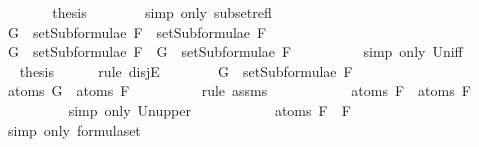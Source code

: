 \begin{isabellebody}
\ \ \ \ \isamarkupfalse%
\ \isamarkupfalse%
\ {\isacharquery}thesis\isanewline
\ \ \ \ \ \ \isamarkupfalse%
\ {\isacharparenleft}simp\ only{\isacharcolon}\ subset{\isacharunderscore}refl{\isacharparenright}\isanewline
\ \ \isamarkupfalse%
\isanewline
\ \ \ \ \isamarkupfalse%
\ {\isachardoublequoteopen}G\ {\isasymin}\ setSubformulae\ F{}\ {\isasymunion}\ setSubformulae\ F{}{\isachardoublequoteclose}\isanewline
\ \ \ \ \isamarkupfalse%
\ \isamarkupfalse%
\ {\isachardoublequoteopen}G\ {\isasymin}\ setSubformulae\ F{}\ {\isasymor}\ G\ {\isasymin}\ setSubformulae\ F{}{\isachardoublequoteclose}\ \ \isanewline
\ \ \ \ \ \ \isamarkupfalse%
\ {\isacharparenleft}simp\ only{\isacharcolon}\ Un{\isacharunderscore}iff{\isacharparenright}\isanewline
\ \ \ \ \isamarkupfalse%
\ \isamarkupfalse%
\ {\isacharquery}thesis\isanewline
\ \ \ \ \isamarkupfalse%
\ {\isacharparenleft}rule\ disjE{\isacharparenright}\isanewline
\ \ \ \ \ \ \isamarkupfalse%
\ {\isachardoublequoteopen}G\ {\isasymin}\ setSubformulae\ F{}{\isachardoublequoteclose}\isanewline
\ \ \ \ \ \ \isamarkupfalse%
\ \isamarkupfalse%
\ {\isachardoublequoteopen}atoms\ G\ {\isasymsubseteq}\ atoms\ F{}{\isachardoublequoteclose}\isanewline
\ \ \ \ \ \ \ \ \isamarkupfalse%
\ {\isacharparenleft}rule\ assms{\isacharparenleft}{}{\isacharparenright}{\isacharparenright}\isanewline
\ \ \ \ \ \ \isamarkupfalse%
\ \isamarkupfalse%
\ {\isachardoublequoteopen}{\isasymdots}\ {\isasymsubseteq}\ atoms\ F{}\ {\isasymunion}\ atoms\ F{}{\isachardoublequoteclose}\isanewline
\ \ \ \ \ \ \ \ \isamarkupfalse%
\ {\isacharparenleft}simp\ only{\isacharcolon}\ Un{\isacharunderscore}upper{}{\isacharparenright}\isanewline
\ \ \ \ \ \ \isamarkupfalse%
\ \isamarkupfalse%
\ {\isachardoublequoteopen}{\isasymdots}\ {\isacharequal}\ atoms\ {\isacharparenleft}F{}\ \isactrlbold {\isasymor}\ F{}{\isacharparenright}{\isachardoublequoteclose}\isanewline
\ \ \ \ \ \ \ \ \isamarkupfalse%
\ {\isacharparenleft}simp\ only{\isacharcolon}\ formula{\isachardot}set{\isacharparenleft}{}{\isacharparenright}{\isacharparenright}\isanewline
\ \ \ \ \ \ \isamarkupfalse%

\end{isabellebody}
